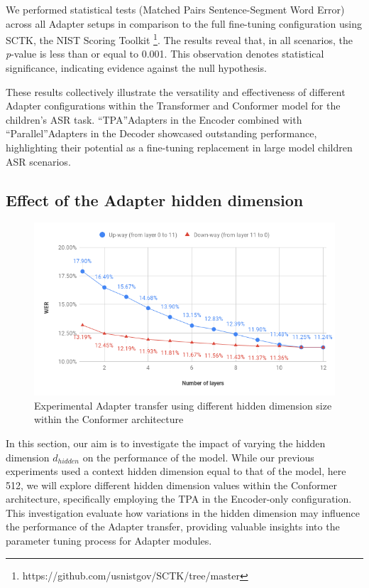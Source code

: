 We performed statistical tests (Matched Pairs Sentence-Segment Word Error) across all Adapter setups in comparison to the full fine-tuning configuration using SCTK, the NIST Scoring Toolkit \footnote{https://github.com/usnistgov/SCTK/tree/master}. 
The results reveal that, in all scenarios, the \textit{p}-value is less than or equal to 0.001. This observation denotes statistical significance, indicating evidence against the null hypothesis. 

These results collectively illustrate the versatility and effectiveness of different Adapter configurations within the Transformer and  Conformer model for the children's ASR task. ``TPA''Adapters in the Encoder combined with ``Parallel''Adapters in the Decoder showcased outstanding performance, highlighting their potential as a fine-tuning replacement in large model children ASR scenarios.

\subsection{Effect of the Adapter hidden dimension}
\begin{figure}
    \begin{center}
    \includegraphics[scale=0.5]{imgs/layerTL.png}
    \caption{Experimental Adapter transfer using different hidden dimension size within the Conformer architecture }
    \label{fig:HiddenDim}    
\end{center}
    
\end{figure}

In this section, our aim is to investigate the impact of varying the hidden dimension $d_{hidden}$ on the performance of the model. While our previous experiments used a context hidden dimension equal to that of the model, here 512, we will explore different hidden dimension values within the Conformer architecture, specifically employing the TPA in the Encoder-only configuration. This investigation evaluate how variations in the hidden dimension may influence the performance of the Adapter transfer, providing valuable insights into the parameter tuning process for Adapter modules.

